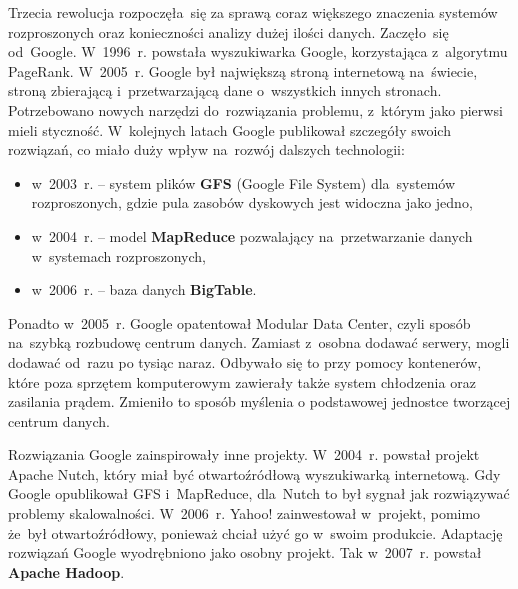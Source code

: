 \documentclass[12pt,a4paper,twoside,titlepage,openright]{book}
\begin{document}
Trzecia rewolucja rozpoczęła~się za sprawą coraz większego znaczenia systemów rozproszonych oraz konieczności analizy dużej ilości danych. Zaczęło~się od~Google. W~1996~r. powstała wyszukiwarka Google, korzystająca z~algorytmu PageRank. W~2005~r. Google był największą stroną internetową na~świecie, stroną zbierającą i~przetwarzającą dane o~wszystkich innych stronach. Potrzebowano nowych narzędzi do~rozwiązania problemu, z~którym jako pierwsi mieli styczność. W~kolejnych latach Google publikował szczegóły swoich rozwiązań, co miało duży wpływ na~rozwój dalszych technologii:
\begin{itemize}
\item w~2003~r. -- system plików \textbf{GFS} (Google File System) dla~systemów rozproszonych, gdzie pula zasobów dyskowych jest widoczna jako jedno,
\item w~2004~r. -- model \textbf{MapReduce} pozwalający na~przetwarzanie danych w~systemach rozproszonych,
\item w~2006~r. -- baza danych \textbf{BigTable}.
\end{itemize}
Ponadto w~2005~r. Google opatentował Modular Data Center, czyli sposób na~szybką rozbudowę centrum danych. Zamiast z~osobna dodawać serwery, mogli dodawać od~razu po tysiąc naraz. Odbywało się to przy pomocy kontenerów, które poza sprzętem komputerowym zawierały także system chłodzenia oraz zasilania prądem. Zmieniło to sposób myślenia o podstawowej jednostce tworzącej centrum danych. \cite{noSqlHistory}

Rozwiązania Google zainspirowały inne projekty. W~2004~r. powstał projekt Apache Nutch, który miał być otwartoźródłową wyszukiwarką internetową. Gdy Google opublikował GFS i~MapReduce, dla~Nutch to był sygnał jak rozwiązywać problemy skalowalności. W~2006~r. Yahoo! zainwestował w~projekt, pomimo że~był otwartoźródłowy, ponieważ chciał użyć go w~swoim produkcie. Adaptację rozwiązań Google wyodrębniono jako osobny projekt. Tak w~2007~r. powstał \textbf{Apache Hadoop}. \cite{hadoop}
\end{document}
